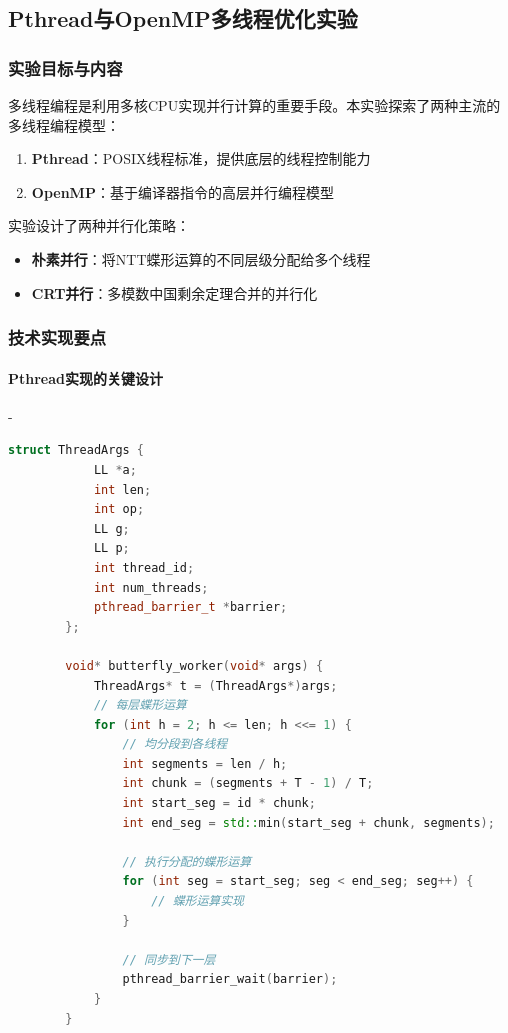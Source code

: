 \documentclass[a4paper]{article}
\begin{document}
	\subsection{Pthread与OpenMP多线程优化实验}
	
	\subsubsection{实验目标与内容}
	
	多线程编程是利用多核CPU实现并行计算的重要手段。本实验探索了两种主流的多线程编程模型：
	
	\begin{enumerate}
		\item \textbf{Pthread}：POSIX线程标准，提供底层的线程控制能力
		\item \textbf{OpenMP}：基于编译器指令的高层并行编程模型
	\end{enumerate}
	
	实验设计了两种并行化策略：
	\begin{itemize}
		\item \textbf{朴素并行}：将NTT蝶形运算的不同层级分配给多个线程
		\item \textbf{CRT并行}：多模数中国剩余定理合并的并行化
	\end{itemize}
	
	\subsubsection{技术实现要点}
	
	\paragraph{Pthread实现的关键设计}
	-
	
	\begin{lstlisting}[language=C++, caption=Pthread多线程NTT核心结构]
		struct ThreadArgs {
			LL *a;
			int len;
			int op;
			LL g;
			LL p;
			int thread_id;
			int num_threads;
			pthread_barrier_t *barrier;
		};
		
		void* butterfly_worker(void* args) {
			ThreadArgs* t = (ThreadArgs*)args;
			// 每层蝶形运算
			for (int h = 2; h <= len; h <<= 1) {
				// 均分段到各线程
				int segments = len / h;
				int chunk = (segments + T - 1) / T;
				int start_seg = id * chunk;
				int end_seg = std::min(start_seg + chunk, segments);
				
				// 执行分配的蝶形运算
				for (int seg = start_seg; seg < end_seg; seg++) {
					// 蝶形运算实现
				}
				
				// 同步到下一层
				pthread_barrier_wait(barrier);
			}
		}
	\end{lstlisting}
	
\end{document}
